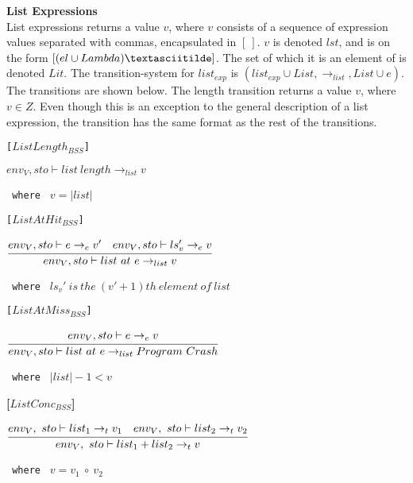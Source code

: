 \textbf{\Large{List Expressions}}\\
List expressions returns a value $v$, where $v$ consists of a sequence of expression values separated with commas, encapsulated in $[\ ]$.
$v$ is denoted $lst$, and is on the form $[(el \cup Lambda)\textasciitilde]$.
The set of which it is an element of is denoted $Lit$.
The transition-system for $list_{exp}$ is $(list_{exp} \cup List, \rightarrow_{list}, List \cup e)$.
The transitions are shown below.
The length transition returns a value $v$, where $v \in Z$.
Even though this is an exception to the general description of a list expression, the transition has the same format as the rest of the transitions.

\texttt{[$ListLength_{BSS}$]}
\begin{center}
	\begin{math}
			{env_V, sto \vdash list\ length \rightarrow_{list} v}
	\end{math}
	
	\texttt{ where } $v = |list|$
\end{center}

\texttt{[$ListAtHit_{BSS}$]}
\begin{center}
	\begin{math}
		\cfrac
			{env_V, sto \vdash e \rightarrow_{e} v' \quad env_V, sto \vdash ls_v' \rightarrow_e v}
			{env_V, sto \vdash list\ at\ e \rightarrow_{list} v}
	\end{math}
	
	\texttt{ where } $ls_v'\ is\ the\ (v' + 1)th\ element\ of\ list$
\end{center}

\texttt{[$ListAtMiss_{BSS}$]}
\begin{center}
	\begin{math}
		\cfrac
			{env_V, sto \vdash e \rightarrow_{e} v}
			{env_V, sto \vdash list\ at\ e \rightarrow_{list} Program\ Crash}
	\end{math}
	
	\texttt{ where } $|list| - 1 < v$
\end{center}


\textbf{[$ListConc_{BSS}$]}
\begin{center}
	\begin{math}
	\cfrac
	{env_V,\ sto \vdash list_1 \rightarrow_t v_1 \quad env_V,\ sto \vdash list_2 \rightarrow_t v_2}
	{env_V,\ sto \vdash list_1 + list_2 \rightarrow_t v}
	\end{math}
	
	\texttt{ where } $v = v_1\ \circ\ v_2$
\end{center}

